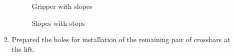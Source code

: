 \begin{enumerate}
\begin{enumerate}
      \begin{figure}[H]
      	\begin{minipage}[h]{0.47\linewidth}
      		\caption{Gripper with slopes}
      	\end{minipage}
      	\hfill
      	\begin{minipage}[h]{0.47\linewidth}
      		\caption{Slopes with stops}
      	\end{minipage}
      \end{figure}
      
      \item Prepared the holes for installation of the remaining pair of crossbars at the lift.
      
    \end{enumerate}
    

\end{enumerate}
